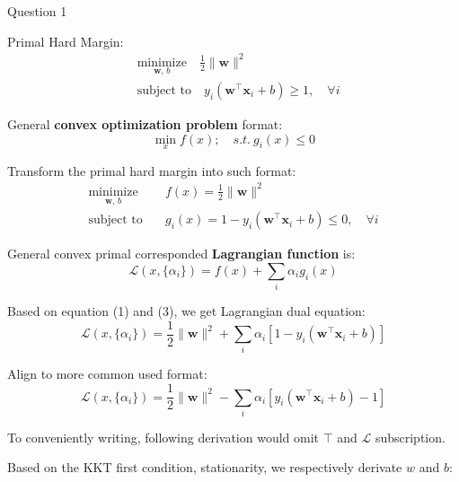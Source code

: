 \documentclass[a4paper,12pt]{article}
\begin{document}
Question 1

Primal Hard Margin:
\begin{equation}
    \begin{aligned}
        &\underset{\mathbf{w},\,b}{\text{minimize}} \quad \frac{1}{2} \|\mathbf{w}\|^2 \\
        &\text{subject to} \quad y_i (\mathbf{w}^\top \mathbf{x}_i + b) \geq 1, \quad \forall i
    \end{aligned}
\end{equation}

General \textbf{convex optimization problem} format:
\begin{equation}
    \min_xf(x);\quad s.t. ~g_i(x)\leq 0
\end{equation}

Transform the primal hard margin into such format:
\begin{equation}
    \begin{aligned}
        \underset{\mathbf{w},\,b}{\text{minimize}} \quad &f(x) = \frac{1}{2} \|\mathbf{w}\|^2 \\
        \text{subject to} \quad &g_i(x) = 1 - y_i (\mathbf{w}^\top \mathbf{x}_i + b) \leq 0, \quad \forall i
    \end{aligned}
\end{equation}

General convex primal corresponded \textbf{Lagrangian function} is:
\begin{equation}
    \mathcal{L}(x, \{\alpha_i\}) = f(x) + \sum_i\alpha_ig_i(x)
\end{equation}

Based on equation (1) and (3), we get Lagrangian dual equation:
\begin{equation}
    \mathcal{L}(x, \{\alpha_i\}) = \frac{1}{2} \|\mathbf{w}\|^2 + \sum_i\alpha_i \left[1 - y_i (\mathbf{w}^\top \mathbf{x}_i + b)\right]
\end{equation}

Align to more common used format:
\begin{equation}
    \mathcal{L}(x, \{\alpha_i\}) = \frac{1}{2} \|\mathbf{w}\|^2 - \sum_i\alpha_i \left[y_i (\mathbf{w}^\top \mathbf{x}_i + b) - 1 \right]
\end{equation}

To conveniently writing, following derivation would omit $\top$ and $\mathcal{L}$ subscription.

Based on the KKT first condition, stationarity, we respectively derivate $w$ and $b$:
\end{document}
